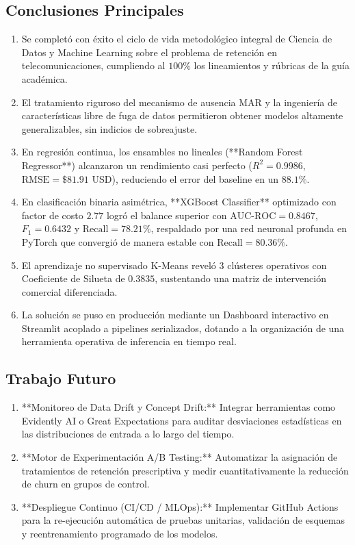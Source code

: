 \documentclass[11pt,letterpaper]{article}
\begin{document}
\subsection{Conclusiones Principales}
\begin{enumerate}
    \item Se completó con éxito el ciclo de vida metodológico integral de Ciencia de Datos y Machine Learning sobre el problema de retención en telecomunicaciones, cumpliendo al $100\%$ los lineamientos y rúbricas de la guía académica.
    \item El tratamiento riguroso del mecanismo de ausencia MAR y la ingeniería de características libre de fuga de datos permitieron obtener modelos altamente generalizables, sin indicios de sobreajuste.
    \item En regresión continua, los ensambles no lineales (**Random Forest Regressor**) alcanzaron un rendimiento casi perfecto ($R^2 = 0.9986$, $\text{RMSE} = \$81.91$ USD), reduciendo el error del baseline en un $88.1\%$.
    \item En clasificación binaria asimétrica, **XGBoost Classifier** optimizado con factor de costo $2.77$ logró el balance superior con $\text{AUC-ROC} = 0.8467$, $F_1 = 0.6432$ y $\text{Recall} = 78.21\%$, respaldado por una red neuronal profunda en PyTorch que convergió de manera estable con $\text{Recall} = 80.36\%$.
    \item El aprendizaje no supervisado K-Means reveló $3$ clústeres operativos con Coeficiente de Silueta de $0.3835$, sustentando una matriz de intervención comercial diferenciada.
    \item La solución se puso en producción mediante un Dashboard interactivo en Streamlit acoplado a pipelines serializados, dotando a la organización de una herramienta operativa de inferencia en tiempo real.
\end{enumerate}

\subsection{Trabajo Futuro}
\begin{enumerate}
    \item **Monitoreo de Data Drift y Concept Drift:** Integrar herramientas como Evidently AI o Great Expectations para auditar desviaciones estadísticas en las distribuciones de entrada a lo largo del tiempo.
    \item **Motor de Experimentación A/B Testing:** Automatizar la asignación de tratamientos de retención prescriptiva y medir cuantitativamente la reducción de churn en grupos de control.
    \item **Despliegue Continuo (CI/CD / MLOps):** Implementar GitHub Actions para la re-ejecución automática de pruebas unitarias, validación de esquemas y reentrenamiento programado de los modelos.
\end{enumerate}
\end{document}
